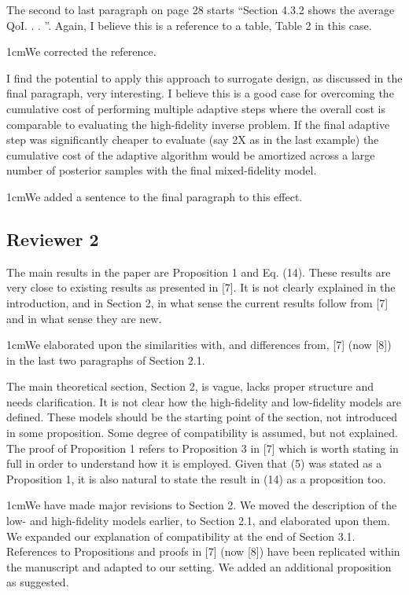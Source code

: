 \documentclass[12pt, letterpaper]{article}
\newcommand{\answer}[1]{\begin{adjustwidth}{1cm}{}{\color{blue}#1}\end{adjustwidth}}
\begin{document}
The second to last paragraph on page 28 starts “Section 4.3.2 shows the average QoI. . . ”. Again, I
believe this is a reference to a table, Table 2 in this case.

\answer{We corrected the reference.}

I find the potential to apply this approach to surrogate design, as discussed in the final paragraph, very
interesting. I believe this is a good case for overcoming the cumulative cost of performing multiple
adaptive steps where the overall cost is comparable to evaluating the high-fidelity inverse problem.
If the final adaptive step was significantly cheaper to evaluate (say 2X as in the last example) the
cumulative cost of the adaptive algorithm would be amortized across a large number of posterior
samples with the final mixed-fidelity model.

\answer{We added a sentence to the final paragraph to this effect.}


\subsection*{Reviewer 2}

The main results in the paper are Proposition 1 and Eq. (14). These results are very close to existing results as presented in [7]. It is not clearly explained in the introduction, and in Section 2, in what sense the current results follow from [7] and in what sense they are new.

\answer{We elaborated upon the similarities with, and differences from, [7] (now [8]) in the last two paragraphs of Section 2.1.}

The main theoretical section, Section 2, is vague, lacks proper structure and needs clarification. It is not clear how the high-fidelity and low-fidelity models are defined. These models should be the starting point of the section, not introduced in some proposition. Some degree of compatibility is assumed, but not explained. The proof of Proposition 1 refers to Proposition 3 in [7] which is worth stating in full in order to understand how it is employed. Given that (5) was stated as a Proposition 1, it is also natural to state the result in (14) as a proposition too.

\answer{We have made major revisions to Section 2. We moved the description of the low- and high-fidelity models earlier, to Section 2.1, and elaborated upon them. We expanded our explanation of compatibility at the end of Section 3.1. References to Propositions and proofs in [7] (now [8]) have been replicated within the manuscript and adapted to our setting. We added an additional proposition as suggested.}
\end{document}
